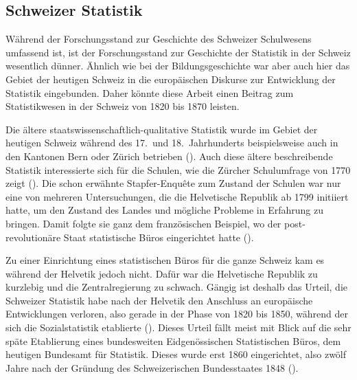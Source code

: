 \subsection{Schweizer Statistik}

Während der Forschungsstand zur Geschichte des Schweizer Schulwesens umfassend ist, ist der Forschungsstand zur Geschichte der Statistik in der Schweiz wesentlich dünner. Ähnlich wie bei der Bildungsgeschichte war aber auch hier das Gebiet der heutigen Schweiz in die europäischen Diskurse zur Entwicklung der Statistik eingebunden. Daher könnte diese Arbeit einen Beitrag zum Statistikwesen in der Schweiz von 1820 bis 1870 leisten.

Die ältere staatswissenschaftlich-qualitative Statistik wurde im Gebiet der heutigen Schweiz während des 17.~und 18.~Jahrhunderts beispielsweise auch in den Kantonen Bern oder Zürich betrieben (\cite{pfister_uss_1995}). Auch diese ältere beschreibende Statistik interessierte sich für die Schulen, wie die Zürcher Schulumfrage von 1770 zeigt (\cite[50-55]{bloch_pfister_priester_2007}). Die schon erwähnte Stapfer-Enquête zum Zustand der Schulen war nur eine von mehreren Untersuchungen, die die Helvetische Republik ab 1799 initiiert hatte, um den Zustand des Landes und mögliche Probleme in Erfahrung zu bringen. Damit folgte sie ganz dem französischen Beispiel, wo der post-revolutionäre Staat statistische Büros eingerichtet hatte (\cite{holenstein_reform_2014}).

Zu einer Einrichtung eines statistischen Büros für die ganze Schweiz kam es während der Helvetik jedoch nicht. Dafür war die Helvetische Republik zu kurzlebig und die Zentralregierung zu schwach. Gängig ist deshalb das Urteil, die Schweizer Statistik habe nach der Helvetik den Anschluss an europäische Entwicklungen verloren, also gerade in der Phase von 1820 bis 1850, während der sich die Sozialstatistik etablierte (\cite[17-22]{jost_von_2016}). Dieses Urteil fällt meist mit Blick auf die sehr späte Etablierung eines bundesweiten Eidgenössischen Statistischen Büros, dem heutigen Bundesamt für Statistik. Dieses wurde erst 1860 eingerichtet, also zwölf Jahre nach der Gründung des Schweizerischen Bundesstaates 1848 (\cite[25]{jost_von_2016}).

